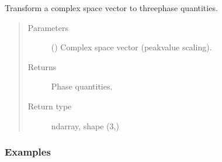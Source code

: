\documentclass[letterpaper,10pt,english]{sphinxmanual}
\begin{document}
\begin{fulllineitems}
\label{\detokenize{helpers:helpers.complex2abc}}
\pysigstartsignatures
{}
\pysigstopsignatures
\sphinxAtStartPar
Transform a complex space vector to three\sphinxhyphen{}phase quantities.
\begin{quote}\begin{description}
\item[{Parameters}] \leavevmode
\sphinxAtStartPar
{} () \textendash{} Complex space vector (peak\sphinxhyphen{}value scaling).

\item[{Returns}] \leavevmode
\sphinxAtStartPar
Phase quantities.

\item[{Return type}] \leavevmode
\sphinxAtStartPar
ndarray, shape (3,)

\end{description}\end{quote}
\subsubsection*{Examples}

\begin{sphinxVerbatim}[commandchars=\\\{\}]
  
\end{sphinxVerbatim}

\end{fulllineitems}

\end{document}
